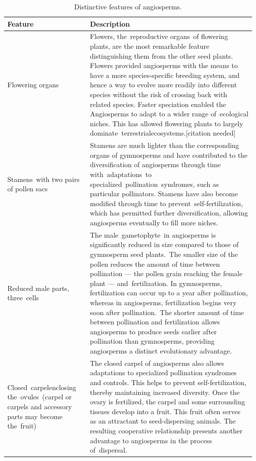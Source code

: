 \begin{table}

\caption{\label{tab:angiospermfeatures}Distinctive features of angiosperms.}
\centering
\begin{tabular}[t]{>{\raggedright\arraybackslash}p{20em}>{\raggedright\arraybackslash}p{45em}}
\toprule
Feature & Description\\
\midrule
\rowcolor{gray!6}  Flowering organs & Flowers, the reproductive organs of flowering plants, are the most remarkable feature distinguishing them from the other seed plants. Flowers provided angiosperms with the means to have a more species-specific breeding system, and hence a way to evolve more readily into different species without the risk of crossing back with related species. Faster speciation enabled the Angiosperms to adapt to a wider range of ecological niches. This has allowed flowering plants to largely dominate terrestrialecosystems.[citation needed]\\
Stamens with two pairs of pollen sacs & Stamens are much lighter than the corresponding organs of gymnosperms and have contributed to the diversification of angiosperms through time with adaptations to specialized pollination syndromes, such as particular pollinators. Stamens have also become modified through time to prevent self-fertilization, which has permitted further diversification, allowing angiosperms eventually to fill more niches.\\
\rowcolor{gray!6}  Reduced male parts, three cells & The male gametophyte in angiosperms is significantly reduced in size compared to those of gymnosperm seed plants. The smaller size of the pollen reduces the amount of time between pollination — the pollen grain reaching the female plant — and fertilization. In gymnosperms, fertilization can occur up to a year after pollination, whereas in angiosperms, fertilization begins very soon after pollination. The shorter amount of time between pollination and fertilization allows angiosperms to produce seeds earlier after pollination than gymnosperms, providing angiosperms a distinct evolutionary advantage.\\
Closed carpelenclosing the ovules (carpel or carpels and accessory parts may become the fruit) & The closed carpel of angiosperms also allows adaptations to specialized pollination syndromes and controls. This helps to prevent self-fertilization, thereby maintaining increased diversity. Once the ovary is fertilized, the carpel and some surrounding tissues develop into a fruit. This fruit often serves as an attractant to seed-dispersing animals. The resulting cooperative relationship presents another advantage to angiosperms in the process of dispersal.\\

\end{tabular}
\end{table}
